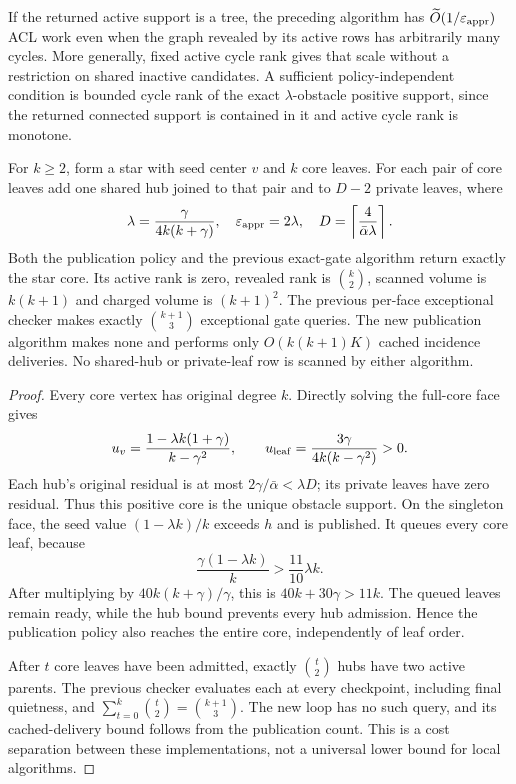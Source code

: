 \begin{corollary}
\label{cor:op3-published-tree-support}
If the returned active support is a tree, the preceding algorithm has
$\widetilde O(1/\varepsilon_{\mathrm{appr}})$ ACL work even when the graph revealed by its
active rows has arbitrarily many cycles. More generally, fixed active
cycle rank gives that scale without a restriction on shared inactive
candidates. A sufficient policy-independent condition is bounded cycle
rank of the exact $\lambda$-obstacle positive support, since the returned
connected support is contained in it and active cycle rank is monotone.
\end{corollary}

\begin{proposition}
\label{prop:op3-shared-pair-star}
For $k\geq2$, form a star with seed center $v$ and $k$ core leaves. For
each pair of core leaves add one shared hub joined to that pair and to
$D-2$ private leaves, where
\[
 \lambda=\frac{\gamma}{4k(k+\gamma)},\quad
 \varepsilon_{\mathrm{appr}}=2\lambda,\quad D=\left\lceil\frac4{\bar\alpha\lambda}\right\rceil.
\]
Both the publication policy and the previous exact-gate algorithm return
exactly the star core. Its active rank is zero, revealed rank is
$\binom{k}{2}$, scanned volume is $k(k+1)$ and charged volume is $(k+1)^2$.
The previous per-face exceptional checker makes exactly
$\binom{k+1}{3}$ exceptional gate queries. The new publication algorithm
makes none and performs only $O(k(k+1)K)$ cached incidence deliveries.
No shared-hub or private-leaf row is scanned by either algorithm.
\end{proposition}
\begin{proof}
Every core vertex has original degree $k$. Directly solving the full-core
face gives
\[
 u_v=\frac{1-\lambda k(1+\gamma)}{k-\gamma^2},\qquad
 u_{\rm leaf}=\frac{3\gamma}{4k(k-\gamma^2)}>0.
\]
Each hub's original residual is at most $2\gamma/\bar\alpha<\lambda D$;
its private leaves have zero residual. Thus this positive core is the
unique obstacle support. On the singleton face, the seed value
$(1-\lambda k)/k$ exceeds $h$ and is published. It queues every core leaf,
because
\[
 \frac{\gamma(1-\lambda k)}{k}>\frac{11}{10}\lambda k.
\]
After multiplying by $40k(k+\gamma)/\gamma$, this is
$40k+30\gamma>11k$. The queued leaves remain ready, while the hub bound
prevents every hub admission. Hence the publication policy also reaches
the entire core, independently of leaf order.

After $t$ core leaves have been admitted, exactly $\binom{t}{2}$ hubs
have two active parents. The previous checker evaluates each at every
checkpoint, including final quietness, and
$\sum_{t=0}^k\binom{t}{2}=\binom{k+1}{3}$. The new loop has no such
query, and its cached-delivery bound follows from the publication count.
This is a cost separation between these implementations, not a universal
lower bound for local algorithms.
\end{proof}

